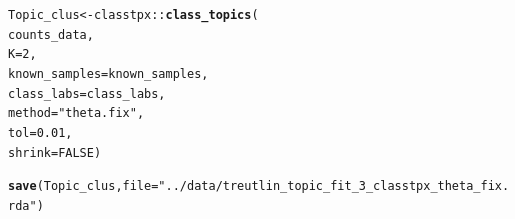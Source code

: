 \documentclass[12pt]{article}\usepackage[]{graphicx}\usepackage[usenames,dvipsnames]{color}
\makeatletter
\newcommand{\hlnum}[1]{\textcolor[rgb]{0.686,0.059,0.569}{#1}}%
\newcommand{\hlstr}[1]{\textcolor[rgb]{0.192,0.494,0.8}{#1}}%
\newcommand{\hlopt}[1]{\textcolor[rgb]{0,0,0}{#1}}%
\newcommand{\hlstd}[1]{\textcolor[rgb]{0.345,0.345,0.345}{#1}}%
\newcommand{\hlkwb}[1]{\textcolor[rgb]{0.69,0.353,0.396}{#1}}%
\newcommand{\hlkwc}[1]{\textcolor[rgb]{0.333,0.667,0.333}{#1}}%
\newcommand{\hlkwd}[1]{\textcolor[rgb]{0.737,0.353,0.396}{\textbf{#1}}}%
\newenvironment{kframe}{%
 \def\at@end@of@kframe{}%
 \ifinner\ifhmode%
  \def\at@end@of@kframe{\end{minipage}}%
  \begin{minipage}{\columnwidth}%
 \fi\fi%
 \def\FrameCommand##1{\hskip\@totalleftmargin \hskip-\fboxsep
 \colorbox{shadecolor}{##1}\hskip-\fboxsep
     \hskip-\linewidth \hskip-\@totalleftmargin \hskip\columnwidth}%
 \MakeFramed {\advance\hsize-\width
   \@totalleftmargin\z@ \linewidth\hsize
   \@setminipage}}%
 {\par\unskip\endMakeFramed%
 \at@end@of@kframe}
\newenvironment{knitrout}{}{} %
\makeatother
\begin{document}
\begin{knitrout}
\color{fgcolor}\begin{kframe}
\begin{alltt}
\hlstd{Topic_clus} \hlkwb{<-} \hlstd{classtpx}\hlopt{::}\hlkwd{class_topics}\hlstd{(}
    \hlstd{counts_data,}
    \hlkwc{K}\hlstd{=}\hlnum{2}\hlstd{,}
    \hlkwc{known_samples} \hlstd{= known_samples,}
    \hlkwc{class_labs} \hlstd{= class_labs,}
    \hlkwc{method}\hlstd{=}\hlstr{"theta.fix"}\hlstd{,}
    \hlkwc{tol}\hlstd{=}\hlnum{0.01}\hlstd{,}
    \hlkwc{shrink}\hlstd{=}\hlnum{FALSE}\hlstd{)}

\hlkwd{save}\hlstd{(Topic_clus,} \hlkwc{file}\hlstd{=}\hlstr{"../data/treutlin_topic_fit_3_classtpx_theta_fix.rda"}\hlstd{)}
\end{alltt}
\end{kframe}
\end{knitrout}
\end{document}
